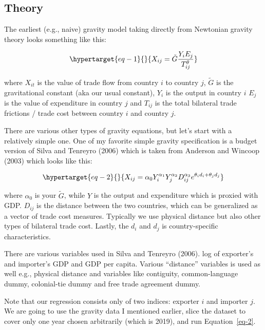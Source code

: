 \documentclass[
  a4paper,
  DIV=11,
  numbers=noendperiod]{scrreprt}
\begin{document}
\hypertarget{theory}{%
\subsection{Theory}\label{theory}}

The earliest (e.g., naive) gravity model taking directly from Newtonian
gravity theory looks something like this:

\begin{equation}\protect\hypertarget{eq-1}{}{
X_{ij}=\tilde{G}\frac{Y_iE_j}{T_{ij}^\theta}
}\label{eq-1}\end{equation}

where \(X_{it}\) is the value of trade flow from country \(i\) to
country \(j\), \(\tilde{G}\) is the gravitational constant (aka our
usual constant), \(Y_i\) is the output in country \(i\) \(E_j\) is the
value of expenditure in country \(j\) and \(T_{ij}\) is the total
bilateral trade frictions / trade cost between country \(i\) and country
\(j\).

There are various other types of gravity equations, but let's start with
a relatively simple one. One of my favorite simple gravity specification
is a budget version of Silva and Tenreyro (2006) which is taken from
Anderson and Wincoop (2003) which looks like this:

\begin{equation}\protect\hypertarget{eq-2}{}{
X_{ij}=\alpha_0 Y_i^{\alpha_1}Y_j^{\alpha_2}D_{ij}^{\alpha_3}e^{\theta_id_i+\theta_jd_j}
}\label{eq-2}\end{equation}

where \(\alpha_0\) is your \(\tilde{G}\), while \(Y\) is the output and
expenditure which is proxied with GDP. \(D_{ij}\) is the distance
between the two countries, which can be generalized as a vector of trade
cost measures. Typically we use physical distance but also other types
of bilateral trade cost. Lastly, the \(d_i\) and \(d_j\) is
country-specific characteristics.

There are various variables used in Silva and Tenreyro (2006). log of
exporter's and importer's GDP and GDP per capita. Various ``distance''
variables is used as well e.g., physical distance and variables like
contiguity, common-language dummy, colonial-tie dummy and free trade
agreement dummy.

Note that our regression consists only of two indices: exporter \(i\)
and importer \(j\). We are going to use the gravity data I mentioned
earlier, slice the dataset to cover only one year chosen arbitrarily
(which is 2019), and run Equation~\ref{eq-2}.
\end{document}
